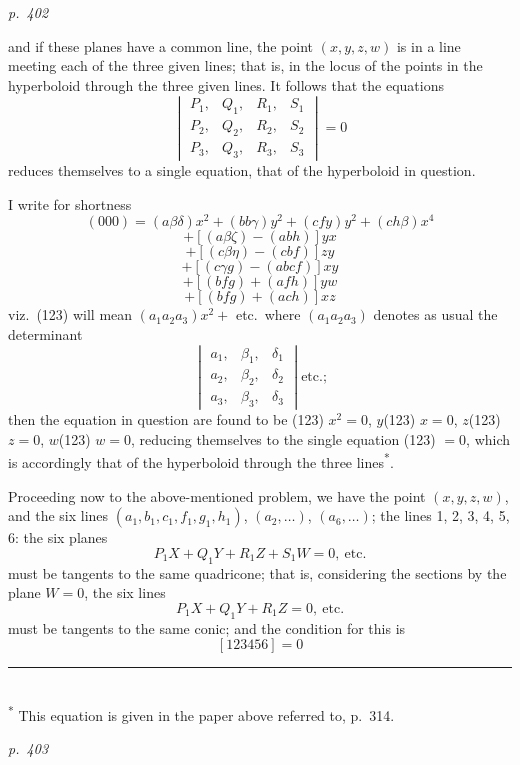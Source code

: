 \documentclass[11pt,a4paper]{book}
\begin{document}
\clearpage

\bigskip
\textit{p.~402}
\smallskip

\noindent
and if these planes have a common line, the point $(x, y, z, w)$ is in a line meeting
each of the three given lines; that is, in the locus of the points in the hyperboloid
through the three given lines.  It follows that the equations
\[
\begin{vmatrix}
P_1, & Q_1, & R_1, & S_1 \\
P_2, & Q_2, & R_2, & S_2 \\
P_3, & Q_3, & R_3, & S_3
\end{vmatrix} = 0
\]
reduces themselves to a single equation, that of the hyperboloid in question.

I write for shortness
\[
(000) = (a\beta\delta) x^2 + (bb \gamma) y^2 + (cf y) y^2 + (ch \beta) x^4
\]
\[
+ [(a\beta\zeta) - (a b h)] y x
\]
\[
+ [(c\beta\eta) - (c b f)] z y
\]
\[
+ [(c\gamma g) - (a b c f)] xy
\]
\[
+ [(b f g) + (a f h)] yw
\]
\[
+ [(b f g) + (a c h)] xz
\]
viz.\ (123) will mean $(a_1 a_2 a_3) x^2 + $ etc.\ where $(a_1 a_2 a_3)$ denotes as usual the determinant
\[
\begin{vmatrix}
a_1, & \beta_1, & \delta_1 \\
a_2, & \beta_2, & \delta_2 \\
a_3, & \beta_3, & \delta_3
\end{vmatrix} \text{etc.;}
\]
then the equation in question are found to be (123) $x^2 = 0$, $y$(123) $x = 0$, $z$(123) $z = 0$,
$w$(123) $w = 0$, reducing themselves to the single equation (123) $= 0$, which is accordingly
that of the hyperboloid through the three lines\textsuperscript{*}.

Proceeding now to the above-mentioned problem, we have the point $(x, y, z, w)$,
and the six lines $(a_1, b_1, c_1, f_1, g_1, h_1)$, $(a_2, \ldots)$, $(a_6, \ldots)$; the lines 1, 2, 3, 4, 5, 6: the
six planes
\[
P_1 X + Q_1 Y + R_1 Z + S_1 W = 0,\ \text{etc.}
\]
must be tangents to the same quadricone; that is, considering the sections by the
plane $W = 0$, the six lines
\[
P_1 X + Q_1 Y + R_1 Z = 0,\ \text{etc.}
\]
must be tangents to the same conic; and the condition for this is
\[
[1 2 3 4 5 6] = 0
\]
\noindent\rule{0.45\textwidth}{0.4pt}\\
\footnotesize\textsuperscript{*} This equation is given in the paper above referred to, p.~314.\normalsize

\clearpage

\bigskip
\textit{p.~403}
\smallskip
\end{document}
